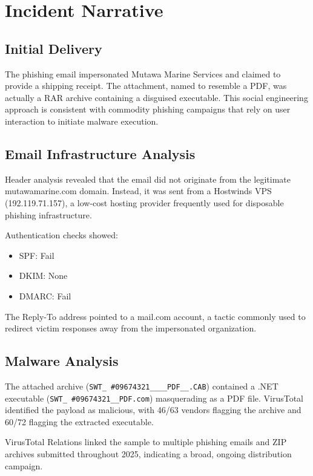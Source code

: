 \documentclass[12pt]{article}
\begin{document}
\section{Incident Narrative}

\subsection{Initial Delivery}
The phishing email impersonated Mutawa Marine Services and claimed to provide a shipping receipt. The attachment, named to resemble a PDF, was actually a RAR archive containing a disguised executable. This social engineering approach is consistent with commodity phishing campaigns that rely on user interaction to initiate malware execution.

\subsection{Email Infrastructure Analysis}
Header analysis revealed that the email did not originate from the legitimate mutawamarine.com domain. Instead, it was sent from a Hostwinds VPS (192.119.71.157), a low-cost hosting provider frequently used for disposable phishing infrastructure.

Authentication checks showed:
\begin{itemize}[noitemsep]
    \item SPF: Fail
    \item DKIM: None
    \item DMARC: Fail
\end{itemize}

The Reply-To address pointed to a mail.com account, a tactic commonly used to redirect victim responses away from the impersonated organization.

\subsection{Malware Analysis}
The attached archive (\texttt{SWT\_ \#09674321\_\_\_\_PDF\_\_.CAB}) contained a .NET executable (\texttt{SWT\_ \#09674321\_\_PDF.com}) masquerading as a PDF file. VirusTotal identified the payload as malicious, with 46/63 vendors flagging the archive and 60/72 flagging the extracted executable.

VirusTotal Relations linked the sample to multiple phishing emails and ZIP archives submitted throughout 2025, indicating a broad, ongoing distribution campaign.
\end{document}
